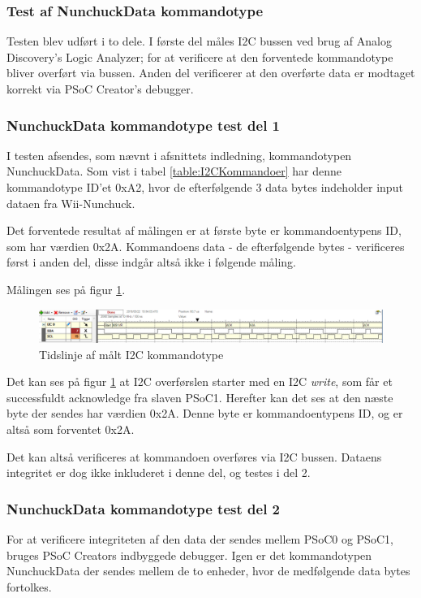 \subsubsection{Test af NunchuckData kommandotype} 

Testen blev udført i to dele. I første del måles I2C bussen ved brug af Analog Discovery's Logic Analyzer; for at verificere at den forventede kommandotype bliver overført via bussen. Anden del verificerer at den overførte data er modtaget korrekt via PSoC Creator's debugger.

\subsubsection{NunchuckData kommandotype test del 1}

I testen afsendes, som nævnt i afsnittets indledning, kommandotypen NunchuckData. Som vist i tabel \ref{table:I2CKommandoer} har denne kommandotype ID'et 0xA2, hvor de efterfølgende 3 data bytes indeholder input dataen fra Wii-Nunchuck.

Det forventede resultat af målingen er at første byte er kommandoentypens ID, som har værdien 0x2A. Kommandoens data - de efterfølgende bytes - verificeres først i anden del, disse indgår altså ikke i følgende måling. 

Målingen ses på figur \ref{fig:NunchuckDataCommand}.

\begin{figure}[H]
	\centering
	\includegraphics[width=1.2\textwidth]{Test/images/ShowsNunchuckDataCommand.png}
	\caption{Tidslinje af målt I2C kommandotype}
	\label{fig:NunchuckDataCommand}
\end{figure}

Det kan ses på figur \ref{fig:NunchuckDataCommand} at I2C overførslen starter med en I2C \textit{write}, som får et successfuldt acknowledge fra slaven PSoC1. Herefter kan det ses at den næste byte der sendes har værdien 0x2A. Denne byte er kommandoentypens ID, og er altså som forventet 0x2A.

Det kan altså verificeres at kommandoen overføres via I2C bussen. Dataens integritet er dog ikke inkluderet i denne del, og testes i del 2.

\subsubsection{NunchuckData kommandotype test del 2}
For at verificere integriteten af den data der sendes mellem PSoC0 og PSoC1, bruges PSoC Creators indbyggede debugger. Igen er det kommandotypen NunchuckData der sendes mellem de to enheder, hvor de medfølgende data bytes fortolkes.

